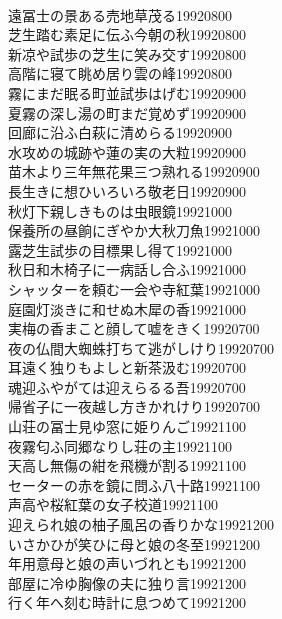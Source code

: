 \begin{multicols}{2}
\\遠冨士の景ある売地草茂る\hfill{19920800}
\\芝生踏む素足に伝ふ今朝の秋\hfill{19920800}
\\新凉や試歩の芝生に笑み交す\hfill{19920800}
\\高階に寝て眺め居り雲の峰\hfill{19920800}
\\霧にまだ眠る町並試歩はげむ\hfill{19920900}
\\夏霧の深し湯の町まだ覚めず\hfill{19920900}
\\回廊に沿ふ白萩に清めらる\hfill{19920900}
\\水攻めの城跡や蓮の実の大粒\hfill{19920900}
\\苗木より三年無花果三つ熟れる\hfill{19920900}
\\長生きに想ひいろいろ敬老日\hfill{19920900}
\\秋灯下親しきものは虫眼鏡\hfill{19921000}
\\保養所の昼餉にぎやか大秋刀魚\hfill{19921000}
\\露芝生試歩の目標果し得て\hfill{19921000}
\\秋日和木椅子に一病話し合ふ\hfill{19921000}
\\シャッターを頼む一会や寺紅葉\hfill{19921000}
\\庭園灯淡きに和せぬ木犀の香\hfill{19921000}
\\実梅の香まこと顔して嘘をきく\hfill{19920700}
\\夜の仏間大蜘蛛打ちて逃がしけり\hfill{19920700}
\\耳遠く独りもよしと新茶汲む\hfill{19920700}
\\魂迎ふやがては迎えらるる吾\hfill{19920700}
\\帰省子に一夜越し方きかれけり\hfill{19920700}
\\山荘の冨士見ゆ窓に姫りんご\hfill{19921100}
\\夜霧匂ふ同郷なりし荘の主\hfill{19921100}
\\天高し無傷の紺を飛機が割る\hfill{19921100}
\\セーターの赤を鏡に問ふ八十路\hfill{19921100}
\\声高や桜紅葉の女子校道\hfill{19921100}
\\迎えられ娘の柚子風呂の香りかな\hfill{19921200}
\\いさかひが笑ひに母と娘の冬至\hfill{19921200}
\\年用意母と娘の声いづれとも\hfill{19921200}
\\部屋に冷ゆ胸像の夫に独り言\hfill{19921200}
\\行く年へ刻む時計に息つめて\hfill{19921200}

\end{multicols}
